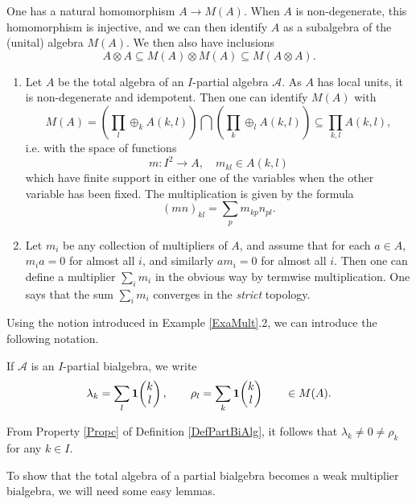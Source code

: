 One has a natural homomorphism $A\rightarrow M(A)$. When $A$ is non-degenerate,  this homomorphism is injective, and we can then identify $A$ as a subalgebra of the (unital) algebra $M(A)$. We then also have inclusions \[A\otimes A\subseteq M(A)\otimes M(A)\subseteq M(A\otimes A).\]

\begin{Exa}\label{ExaMult} \begin{enumerate}
\item Let $A$ be the total algebra of an $I$-partial algebra $\mathscr{A}$. As $A$ has local units, it is non-degenerate and idempotent. Then one can identify $M(A)$ with \[M(A) = \left(\prod_l \oplus_k A(k,l)\right) \bigcap \left(\prod_k\oplus_l A(k,l)\right) \subseteq \prod_{k,l} A(k,l),\] i.e. with the space of functions \[m:I^2\rightarrow A,\quad m_{kl}\in A(k,l)\] which have finite support in either one of the variables when the other variable has been fixed. The multiplication is given by the formula \[(mn)_{kl} = \sum_p m_{kp}n_{pl}.\]
\item Let $m_i$ be any collection of multipliers of $A$, and assume that for each $a\in A$, $m_ia =0$ for almost all $i$, and similarly $am_i=0$ for almost all $i$. Then one can define a multiplier $\sum_i m_i$ in the obvious way by termwise multiplication. One says that the sum $\sum_i m_i$ converges in the \emph{strict} topology. 
\end{enumerate}
\end{Exa}

Using the notion introduced in Example \ref{ExaMult}.2, we can introduce the following notation.

\begin{Not}
If $\mathscr{A}$ is an $I$-partial bialgebra, we write \[\lambda_k = \sum_l \mathbf{1}\!\begin{pmatrix} k \\ l\end{pmatrix},\qquad \rho_l = \sum_k\mathbf{1}\!\begin{pmatrix} k \\ l\end{pmatrix} \qquad \in M(A).\]
\end{Not}

\begin{Rem} From Property \ref{Propc} of Definition \ref{DefPartBiAlg}, it follows that $\lambda_k\neq 0\neq \rho_k$ for any $k\in I$.
\end{Rem} 

To show that the total algebra of a partial bialgebra becomes a weak multiplier bialgebra, we will need some easy lemmas. 

